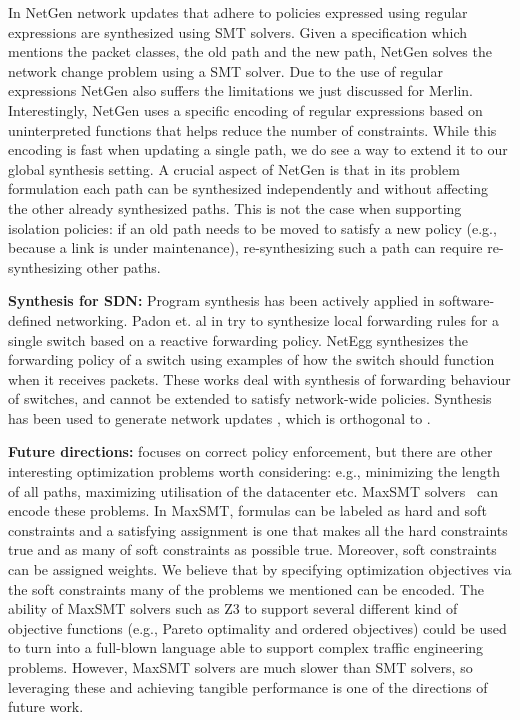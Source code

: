 In NetGen network updates that adhere to policies expressed using
regular expressions are synthesized using SMT solvers.  Given a
specification which mentions the packet classes, the old path and the
new path, NetGen solves the network change problem using a SMT solver.
Due to the use of regular expressions NetGen also suffers the
limitations we just discussed for Merlin.  Interestingly, NetGen uses
a specific encoding of regular expressions based on uninterpreted
functions that helps reduce the number of constraints. While this
encoding is fast when updating a single path, we do see a way to
extend it to our global synthesis setting.  A crucial aspect of NetGen
is that in its problem formulation each path can be synthesized
independently and without affecting the other already synthesized
paths.  This is not the case when supporting isolation policies: if an
old path needs to be moved to satisfy a new policy (e.g., because a
link is under maintenance), re-synthesizing such a path can require
re-synthesizing other paths.  

\noindent
{\bf Synthesis for SDN:}
Program synthesis has been actively applied in software-defined
networking. Padon et. al in \cite{decentralize} try to synthesize
local forwarding rules for a single switch based on a reactive
forwarding policy.  NetEgg \cite{netegg} synthesizes the forwarding
policy of a switch using examples of how the switch should function
when it receives packets. These works deal with synthesis of
forwarding behaviour of switches, and cannot be extended to satisfy
network-wide policies.  Synthesis has been used to generate network
updates \cite{updates, customconsistency}, which is orthogonal to \Name.


\noindent
{\bf Future directions:}
\Name focuses on correct policy enforcement, but there are other
interesting optimization problems worth considering: e.g., minimizing
the length of all paths, maximizing utilisation of the datacenter
etc. MaxSMT solvers~\cite{z3maxSMT} can encode these problems.  In
MaxSMT, formulas can be labeled as hard and soft constraints and a
satisfying assignment is one that makes all the hard constraints true
and as many of soft constraints as possible true.  Moreover, soft
constraints can be assigned weights.  We believe that by specifying
optimization objectives via the soft constraints many of the problems
we mentioned can be encoded.  The ability of MaxSMT solvers such as Z3
to support several different kind of objective functions (e.g., Pareto
optimality and ordered objectives) could be used to turn \Name into a
full-blown language able to support complex traffic engineering
problems.  However, MaxSMT solvers are much slower than SMT solvers,
so leveraging these and achieving tangible performance is one of the
directions of future work.
 

